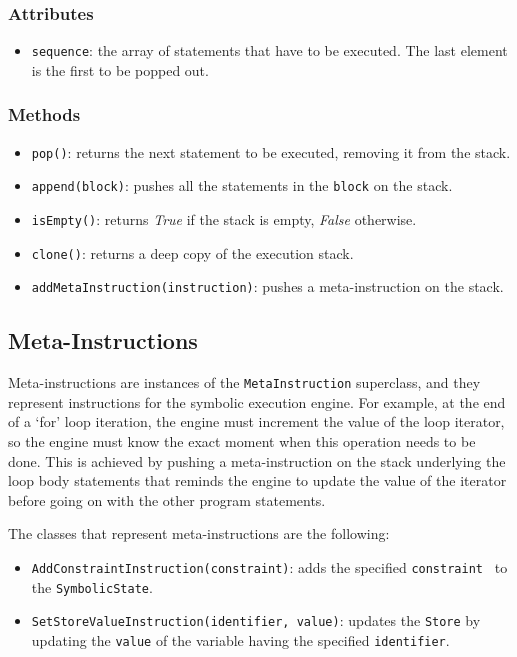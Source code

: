 \documentclass[12pt,a4paper]{report}
\theoremstyle{definition}
\theoremstyle{definition}
\theoremstyle{definition}
\begin{document}
\subsubsection{Attributes}
\begin{itemize}
    \itemsep 0em
    \item \texttt{sequence}: the array of statements that have to be executed. The last element is the first to be popped out.
\end{itemize}
\subsubsection{Methods}
\begin{itemize}
    \itemsep 0em
    \item \texttt{pop()}: returns the next statement to be executed, removing it from the stack.
    \item \texttt{append(block)}: pushes all the statements in the \texttt{block} on the stack.
    \item \texttt{isEmpty()}: returns \textit{True} if the stack is empty, \textit{False} otherwise.
    \item \texttt{clone()}: returns a deep copy of the execution stack.
    \item \texttt{addMetaInstruction(instruction)}: pushes a meta-instruction on the stack.
\end{itemize}


\subsection{Meta-Instructions}
Meta-instructions are instances of the \texttt{MetaInstruction} superclass, and they represent instructions for the symbolic execution engine. For example, at the end of a `for' loop iteration, the engine must increment the value of the loop iterator, so the engine must know the exact moment when this operation needs to be done. This is achieved by pushing a meta-instruction on the stack underlying the loop body statements that reminds the engine to update the value of the iterator before going on with the other program statements.

The classes that represent meta-instructions are the following:
\begin{itemize}
    \itemsep 0em
    \item \texttt{AddConstraintInstruction(constraint)}: adds the specified \texttt{constraint } to the \texttt{SymbolicState}.
    \item \texttt{SetStoreValueInstruction(identifier, value)}: updates the \texttt{Store} by updating the \texttt{value} of the variable having the specified \texttt{identifier}.
\end{itemize}
\end{document}

